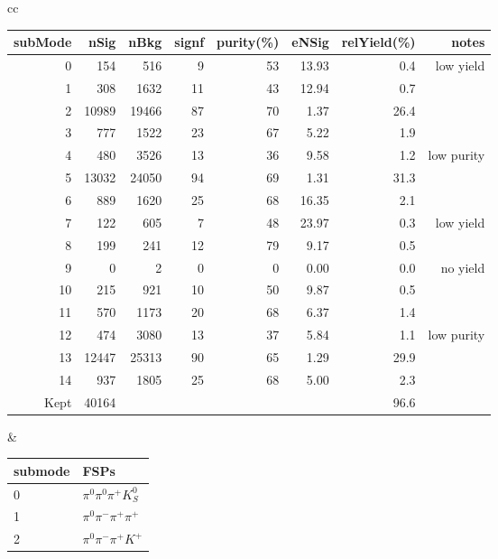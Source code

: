 \begin{table}[h!]
\begin{center}
\begin{tabular}{cc}

\begin{tabular}{|rrrrrrrr|}
\hline
subMode  &  nSig &  nBkg &  signf&  purity(\%)&eNSig & relYield(\%)  & notes\\
\hline
0        &  154  &  516  &  9    &  53       &  13.93& 0.4           & low yield\\
1        &  308  &  1632 &  11   &  43       &  12.94& 0.7           & \\
2        &  10989&  19466&  87   &  70       &  1.37 & 26.4          & \\
3        &  777  &  1522 &  23   &  67       &  5.22 & 1.9           & \\
4        &  480  &  3526 &  13   &  36       &  9.58 & 1.2           & low purity\\
5        &  13032&  24050&  94   &  69       &  1.31 & 31.3          & \\
6        &  889  &  1620 &  25   &  68       &  16.35& 2.1           & \\
7        &  122  &  605  &  7    &  48       &  23.97& 0.3           & low yield\\
8        &  199  &  241  &  12   &  79       &  9.17 & 0.5           & \\
9        &  0    &  2    &  0    &  0        &  0.00 & 0.0           & no yield\\
10       &  215  &  921  &  10   &  50       &  9.87 & 0.5           & \\
11       &  570  &  1173 &  20   &  68       &  6.37 & 1.4           & \\
12       &  474  &  3080 &  13   &  37       &  5.84 & 1.1           & low purity\\
13       &  12447&  25313&  90   &  65       &  1.29 & 29.9          & \\
14       &  937  &  1805 &  25   &  68       &  5.00 & 2.3           & \\
\hline
Kept&40164&&&&&96.6&\\
\hline
\end{tabular}
&
\begin{tabular}{|ll|}
\hline
submode& FSPs\\
\hline
0 & $\pi^0 \pi^0 \pi^+ K_S^0 $ \\
1 & $\pi^0 \pi^- \pi^+ \pi^+ $ \\
2 & $\pi^0 \pi^- \pi^+ K^+ $ \\

\end{tabular}
\end{tabular}
\end{center}
\end{table}
